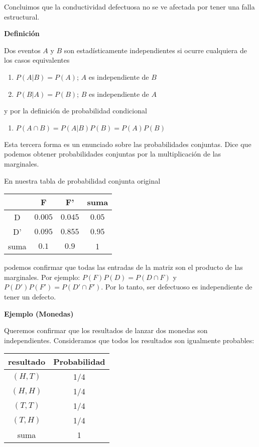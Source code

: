 \documentclass[
]{book}
\providecommand{\tightlist}{%
  \setlength{\itemsep}{0pt}\setlength{\parskip}{0pt}}
\begin{document}
Concluimos que la conductividad defectuosa no se ve afectada por tener una falla estructural.

\textbf{Definición}

Dos eventos \(A\) y \(B\) son estadísticamente independientes si ocurre cualquiera de los casos equivalentes

\begin{enumerate}
\def\labelenumi{\arabic{enumi})}
\tightlist
\item
  \(P(A|B)=P(A)\); \(A\) es independiente de \(B\)
\item
  \(P(B|A)=P(B)\); \(B\) es independiente de \(A\)
\end{enumerate}

y por la definición de probabilidad condicional

\begin{enumerate}
\def\labelenumi{\arabic{enumi})}
\setcounter{enumi}{2}
\tightlist
\item
  \(P(A\cap B)=P(A|B)P(B)=P(A)P(B)\)
\end{enumerate}

Esta tercera forma es un enunciado sobre las probabilidades conjuntas. Dice que podemos obtener probabilidades conjuntas por la multiplicación de las marginales.

En nuestra tabla de probabilidad conjunta original

\begin{longtable}[]{@{}cccc@{}}
\toprule
& F & F' & suma \\
\midrule
\endhead
D & \(0.005\) & \(0.045\) & \(0.05\) \\
D' & \(0.095\) & \(0.855\) & \(0.95\) \\
suma & \(0.1\) & \(0.9\) & 1 \\
\bottomrule
\end{longtable}

podemos confirmar que todas las entradas de la matriz son el producto de las marginales. Por ejemplo: \(P(F)P(D)= P(D \cap F)\) y \(P(D')P(F')=P(D' \cap F')\). Por lo tanto, ser defectuoso es independiente de tener un defecto.

\textbf{Ejemplo (Monedas)}

Queremos confirmar que los resultados de lanzar dos monedas son independientes. Consideramos que todos los resultados son igualmente probables:

\begin{longtable}[]{@{}cc@{}}
\toprule
resultado & Probabilidad \\
\midrule
\endhead
\((H,T)\) & 1/4 \\
\((H,H)\) & 1/4 \\
\((T,T)\) & 1/4 \\
\((T,H)\) & 1/4 \\
suma & 1 \\
\bottomrule
\end{longtable}
\end{document}
